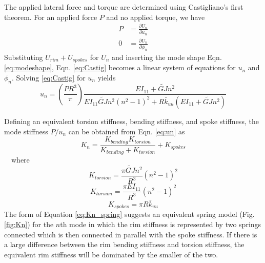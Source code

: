 \documentclass{bmd2016p}
\begin{document}
The applied lateral force and torque are determined using Castigliano's first theorem. For an applied force $P$ and no applied torque, we have
	\begin{equation}\label{eq:Castig}
	\begin{split}
	P &= \frac{\partial U_n}{\partial u_n}\\%
	0 &= \frac{\partial U_n}{\partial \phi_n}%
	\end{split}
	\end{equation}
Substituting $U_{rim} + U_{spokes}$ for $U_n$ and inserting the mode shape Eqn. \ref{eq:modeshape}, Eqn. \ref{eq:Castig} becomes a linear system of equations for $u_n$ and $\phi_n$. Solving \ref{eq:Castig} for $u_n$ yields
	\begin{equation}\label{eq:un}
	u_n = \left(\frac{PR^3}{\pi}\right) \frac{EI_{11}+\widetilde{GJ}n^2}{EI_{11}\widetilde{GJ}n^2(n^2-1)^2 + R\bar{k}_{uu}(EI_{11}+\widetilde{GJ}n^2)}
	\end{equation}

Defining an equivalent torsion stiffness, bending stiffness, and spoke stiffness, the mode stiffness $P/u_n$ can be obtained from Eqn. \ref{eq:un} as
	\begin{equation}\label{eq:Kn_spring}
	K_n = \frac{K_{bending}K_{torsion}}{K_{bending}+K_{torsion}} + K_{spokes}
	\end{equation}
\,\,\,\, where
	\begin{equation}\label{eq:Ktorsion}
	K_{torsion} = \frac{\pi\widetilde{GJ}n^2}{R^3}(n^2-1)^2
	\end{equation}
	\begin{equation}\label{eq:Kbending}
	K_{torsion} = \frac{\pi EI_{11}}{R^3}(n^2-1)^2
	\end{equation}
	\begin{equation}\label{eq:Kspokes}
	K_{spokes} = \pi R \bar{k}_{uu}
	\end{equation}
The form of Equation \ref{eq:Kn_spring} suggests an equivalent spring model (Fig. \ref{fig:Kn}) for the $n$th mode in which the rim stiffness is represented by two springs connected which is then connected in parallel with the spoke stiffness. If there is a large difference between the rim bending stiffness and torsion stiffness, the equivalent rim stiffness will be dominated by the smaller of the two.
\end{document}

